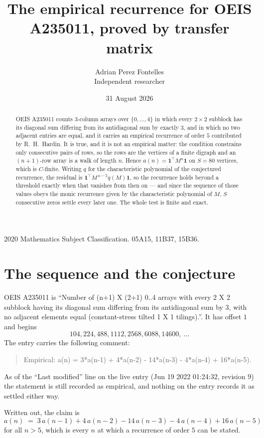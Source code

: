 \documentclass[11pt,a4paper]{article}
\title{The empirical recurrence for OEIS A235011, proved by transfer matrix}
\author{Adrian Perez Fontelles\\ \small Independent researcher}
\date{31 August 2026}
\theoremstyle{plain}
\theoremstyle{definition}
\begin{document}
\maketitle

\begin{abstract}
OEIS A235011 counts $3$-column arrays over $\{0,\dots,4\}$ in which every
$2\times2$ subblock has its diagonal sum differing from its antidiagonal sum by
exactly $3$, and in which no two adjacent entries are equal, and it
carries an empirical recurrence of order $5$ contributed by R.~H.~Hardin. It is true,
and it is not an empirical matter: the condition constrains only consecutive pairs of rows,
so the rows are the vertices of a finite digraph and an $(n+1)$-row array is a walk of
length $n$. Hence $a(n)=\mathbf{1}^{\!\top}M^{n}\mathbf{1}$ on $S=80$ vertices, which
is $C$-finite. Writing $q$ for the characteristic polynomial of the conjectured recurrence,
the residual is $\mathbf{1}^{\!\top}M^{\,n-5}q(M)\mathbf{1}$, so the recurrence
holds beyond a threshold exactly when that vanishes from then on --- and since the sequence
of those values obeys the monic recurrence given by the characteristic polynomial of $M$,
$S$ consecutive zeros settle every later one. The whole test is finite and exact.
\end{abstract}

\noindent\small 2020 Mathematics Subject Classification. 05A15, 11B37, 15B36.\normalsize

\section{The sequence and the conjecture}

OEIS A235011 is ``Number of (n+1) X (2+1) 0..4 arrays with every 2 X 2 subblock having its diagonal sum differing from its antidiagonal sum by 3, with no adjacent elements equal (constant-stress tilted 1 X 1 tilings).''. It has offset
$1$ and begins
\[
104, 224, 488, 1112, 2568, 6088, 14600,\ \dots
\]
The entry carries the following comment:
\begin{quote}\small
Empirical: a(n) = 3*a(n-1) + 4*a(n-2) - 14*a(n-3) - 4*a(n-4) + 16*a(n-5).
\end{quote}
As of the ``Last modified'' line on the live entry (Jun 19 2022 01:24:32, revision 9) the statement is
still recorded as empirical, and nothing on the entry records it as settled either way.

Written out, the claim is
\begin{equation}\label{eq:conj}
a(n)\;=\;3\,a(n-1) + 4\,a(n-2) - 14\,a(n-3) - 4\,a(n-4) + 16\,a(n-5)
\end{equation}
for all $n>5$, which is every $n$ at which a recurrence of order $5$ can be
stated.
\end{document}
